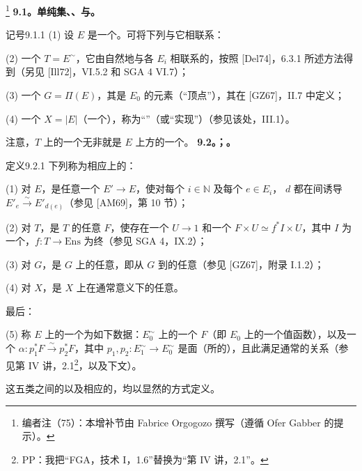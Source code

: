 \footnote{编者注（75）：本增补节由 Fabrice Orgogozo 撰写（遵循 Ofer Gabber 的提示）。}
\textbf{9.1。单纯集、、与。}
\begin{SGAresult}{记号}{9.1.1}
(1) 设 $E$ 是一个。可将下列与它相联系：

(2) 一个 $T=E^\sim$，它由自然地与各 $E_i$ 相联系的，按照 [Del74]，6.3.1 所述方法得到（另见 [Ill72]，VI.5.2 和 SGA 4 VI.7）；

(3) 一个 $G=\Pi(E)$，其是 $E_0$ 的元素（“顶点”），其在 [GZ67]，II.7 中定义；

(4) 一个 $X=|E|$（一个），称为“”（或“实现”）（参见该处，III.1）。
\end{SGAresult}
注意，$T$ 上的一个无非就是 $E$ 上方的一个。
\textbf{9.2。；。}
\begin{SGAresult}{定义}{9.2.1}
下列称为相应上的：

(1) 对 $E$，是任意一个 $E'\to E$，使对每个 $i\in\mathbb N$ 及每个 $e\in E_i$， $d$ 都在间诱导 $E'_e\xrightarrow\sim E'_{d(e)}$（参见 [AM69]，第 10 节）；

(2) 对 $T$，是 $T$ 的任意 $F$，使存在一个 $U\to1$ 和一个 $F\times U\simeq f^*I\times U$，其中 $I$ 为一个，$f:T\to\mathrm{Ens}$ 为终（参见 SGA 4，IX.2）；

(3) 对 $G$，是 $G$ 上的任意，即从 $G$ 到的任意（参见 [GZ67]，附录 I.1.2）；

(4) 对 $X$，是 $X$ 上在通常意义下的任意。

最后：

(5) 称 $E$ 上的一个为如下数据：$E_0^\sim$ 上的一个 $F$（即 $E_0$ 上的一个值函数），以及一个 $\alpha:p_1^*F\xrightarrow\sim p_2^*F$，其中 $p_1,p_2:E_1^\sim\to E_0^\sim$ 是面（所的），且此满足通常的关系（参见第 IV 讲，2.1\footnote{PP：我把“FGA，技术 I，1.6”替换为“第 IV 讲，2.1”。}，以及下文）。
\end{SGAresult}
这五类之间的以及相应的，均以显然的方式定义。

